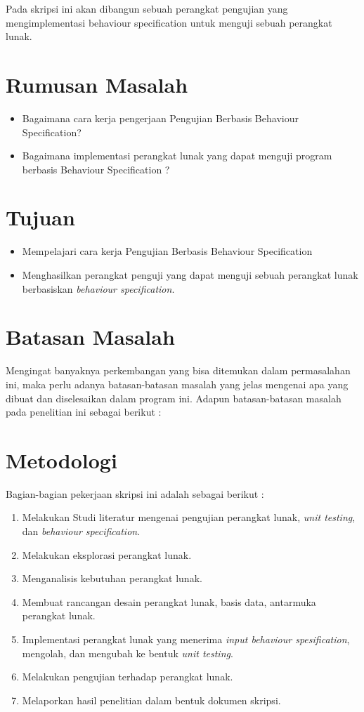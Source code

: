 Pada skripsi ini akan dibangun sebuah perangkat pengujian yang mengimplementasi behaviour specification untuk menguji sebuah perangkat lunak.
\section{Rumusan Masalah}
\label{sec:rumusan}
\begin{itemize}
\item Bagaimana cara kerja pengerjaan Pengujian Berbasis Behaviour Specification?
\item Bagaimana implementasi perangkat lunak yang dapat menguji program berbasis Behaviour Specification ?	
\end{itemize}

\section{Tujuan}
\label{sec:tujuan}
\begin{itemize}
\item Mempelajari cara kerja Pengujian Berbasis Behaviour Specification
\item Menghasilkan perangkat penguji yang dapat menguji sebuah perangkat lunak berbasiskan \textit{behaviour specification}.
\end{itemize}

\section{Batasan Masalah}
\label{sec:batasan}
Mengingat banyaknya perkembangan yang bisa ditemukan dalam permasalahan ini, maka perlu adanya batasan-batasan masalah yang jelas mengenai apa yang dibuat dan diselesaikan dalam program ini. Adapun batasan-batasan masalah pada penelitian ini sebagai berikut :

\section{Metodologi}
\label{sec:metlit}
Bagian-bagian pekerjaan skripsi ini adalah sebagai berikut :
\begin{enumerate}
\item Melakukan Studi literatur mengenai pengujian perangkat lunak, \textit{unit testing}, dan \textit{behaviour specification}.
\item Melakukan eksplorasi perangkat lunak.
\item Menganalisis kebutuhan perangkat lunak.
\item Membuat rancangan desain perangkat lunak, basis data, antarmuka perangkat lunak.
\item Implementasi perangkat lunak yang menerima \textit{input behaviour spesification}, mengolah, dan mengubah ke bentuk \textit{unit testing}.
\item Melakukan pengujian terhadap perangkat lunak.
\item Melaporkan hasil penelitian dalam bentuk dokumen skripsi.
\end{enumerate}

